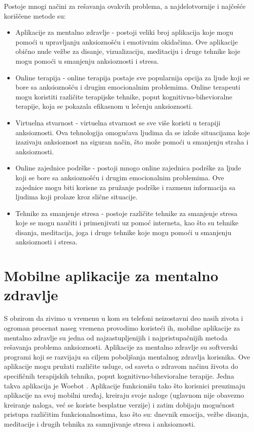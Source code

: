 \documentclass[a4paper]{article}
\begin{document}
Postoje mnogi načini za rešavanja ovakvih problema, a najdelotvornije i najčešće koriščene metode su:

\begin{itemize}
\item Aplikacije za mentalno zdravlje - postoji veliki broj aplikacija koje mogu pomoći u upravljanju anksioznošću i emotivnim okidačima. Ove aplikacije obično nude vežbe za disanje, vizualizaciju, meditaciju i druge tehnike koje mogu pomoći u smanjenju anksioznosti i stresa.
\item Online terapija - online terapija postaje sve popularnija opcija za ljude koji se bore sa anksioznošću i drugim emocionalnim problemima. Online terapeuti mogu koristiti različite terapijske tehnike, poput kognitivno-bihevioralne terapije, koja se pokazala efikasnom u lečenju anksioznosti.
      
\item Virtuelna stvarnost - virtuelna stvarnost se sve više koristi u terapiji anksioznosti. Ova tehnologija omogućava ljudima da se izlože situacijama koje izazivaju anksioznost na siguran način, što može pomoći u smanjenju straha i anksioznosti.

\item Online zajednice podrške - postoji mnogo online zajednica podrške za ljude koji se bore sa anksioznošću i drugim emocionalnim problemima. Ove zajednice mogu biti korisne za pružanje podrške i razmenu informacija sa ljudima koji prolaze kroz slične situacije.

\item Tehnike za smanjenje stresa - postoje različite tehnike za smanjenje stresa koje se mogu naučiti i primenjivati uz pomoć interneta, kao što su tehnike disanja, meditacija, joga i druge tehnike koje mogu pomoći u smanjenju anksioznosti i stresa.
\end{itemize} 


\section{Mobilne aplikacije za mentalno zdravlje}
\label{sec:mobilneAplikacije}
S obzirom da zivimo u vremenu u kom su telefoni neizostavni deo nasih zivota i ogroman procenat naseg vremena provodimo koristeći ih, mobilne aplikacije za mentalno zdravlje su jedna od najzastupljenijih i najpristupačnijih metoda rešavanja problema anksioznosti.
Aplikacije za mentalno zdravlje su softverski programi koji se razvijaju sa ciljem poboljšanja mentalnog zdravlja korisnika. Ove aplikacije mogu pružati različite usluge, od saveta o zdravom načinu života do specifičnih terapijskih tehnika, poput kognitivno-bihevioralne terapije. Jedna takva aplikacija je Woebot \cite{sesnaest}. 
Aplikacije funkcionišu tako što korisnici preuzimaju aplikacije na svoj mobilni uređaj, kreiraju svoje naloge (uglavnom nije obavezno kreiranje naloga, već se koriste besplatne verzije) i zatim dobijaju mogućnost pristupa različitim funkcionalnostima, kao što su: dnevnik emocija, vežbe disanja, meditacije i drugih tehnika za samnjivanje stresa i anksioznosti. 
\end{document}
